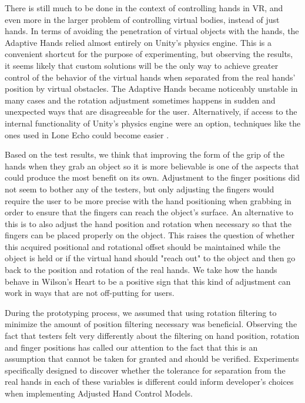 There is still much to be done in the context of controlling hands in VR, and even more in the larger problem of controlling virtual bodies, instead of just hands. In terms of avoiding the penetration of virtual objects with the hands, the Adaptive Hands relied almost entirely on Unity's physics engine. This is a convenient shortcut for the purpose of experimenting, but observing the results, it seems likely that custom solutions will be the only way to achieve greater control of the behavior of the virtual hands when separated from the real hands' position by virtual obstacles. The Adaptive Hands became noticeably unstable in many cases and the rotation adjustment sometimes happens in sudden and unexpected ways that are disagreeable for the user. Alternatively, if access to the internal functionality of Unity's physics engine were an option, techniques like the ones used in Lone Echo could become easier \parencite{loneEchoVideo}.

Based on the test results, we think that improving the form of the grip of the hands when they grab an object so it is more believable is one of the aspects that could produce the most benefit on its own. Adjustment to the finger positions did not seem to bother any of the testers, but only adjusting the fingers would require the user to be more precise with the hand positioning when grabbing in order to ensure that the fingers can reach the object's surface. An alternative to this is to also adjust the hand position and rotation when necessary so that the fingers can be placed properly on the object. This raises the question of whether this acquired positional and rotational offset should be maintained while the object is held or if the virtual hand should "reach out" to the object and then go back to the position and rotation of the real hands. We take how the hands behave in Wilson's Heart to be a positive sign that this kind of adjustment can work in ways that are not off-putting for users.

During the prototyping process, we assumed that using rotation filtering to minimize the amount of position filtering necessary was beneficial. Observing the fact that testers felt very differently about the filtering on hand position, rotation and finger positions has called our attention to the fact that this is an assumption that cannot be taken for granted and should be verified. Experiments specifically designed to discover whether the tolerance for separation from the real hands in each of these variables is different could inform developer's choices when implementing Adjusted Hand Control Models.

